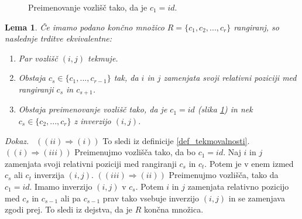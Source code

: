 \documentclass[a4paper, 12pt]{book}
\newtheorem{lema}{Lema}[chapter]
\newenvironment{dokaz}{\emph{Dokaz.}\ }{\hspace{\fill}{$\Box$}}
\begin{document}
\begin{figure}[h]
    \begin{center}        
    \end{center}
    \caption{Preimenovanje vozlišč tako, da je $c_1 = id$.}
    \label{preimenovanje_vozlisc_id}
\end{figure}

\begin{lema}
    Če imamo podano končno množico $R = \{ c_1, c_2, ..., c_r \}$ rangiranj, so naslednje trditve ekvivalentne:
    \begin{enumerate}[label=(\roman*)]
        \item Par vozlišč $(i, j)$ tekmuje.
        \item Obstaja $c_s \in \{ c_1, ..., c_{r-1} \}$ tak, da $i$ in $j$ zamenjata svoji relativni poziciji med rangiranji $c_s$ in $c_{s+1}$.
        \item Obstaja preimenovanje vozlišč tako, da je $c_1 = id$ (slika \ref{preimenovanje_vozlisc_id}) in nek $c_s \in \{c_2, ..., c_r\}$ z inverzijo $(i, j)$.
    \end{enumerate}
\end{lema}
\begin{dokaz}
    $((ii) \Rightarrow (i))$ To sledi iz definicije \ref{def_tekmovalnosti}. $((i) \Rightarrow (iii))$ Preimenujmo vozlišča tako, da bo $c_1 = id$. Naj $i$ in $j$ zamenjata svoji relativni poziciji med rangiranji $c_s$ in $c_t$. Potem je v enem izmed $c_s$ ali $c_t$ inverzija $(i, j)$. $((iii) \Rightarrow (ii))$ Preimenujmo vozlišča, tako da $c_1 = id$. Imamo inverzijo $(i, j)$ v $c_s$. Potem $i$ in $j$ zamenjata relativno pozicijo med $c_s$ in $c_{s-1}$ ali pa $c_{s-1}$ prav tako vsebuje inverzijo $(i, j)$ in se zamenjava zgodi prej. To sledi iz dejstva, da je $R$ končna množica.
\end{dokaz}
\end{document}
